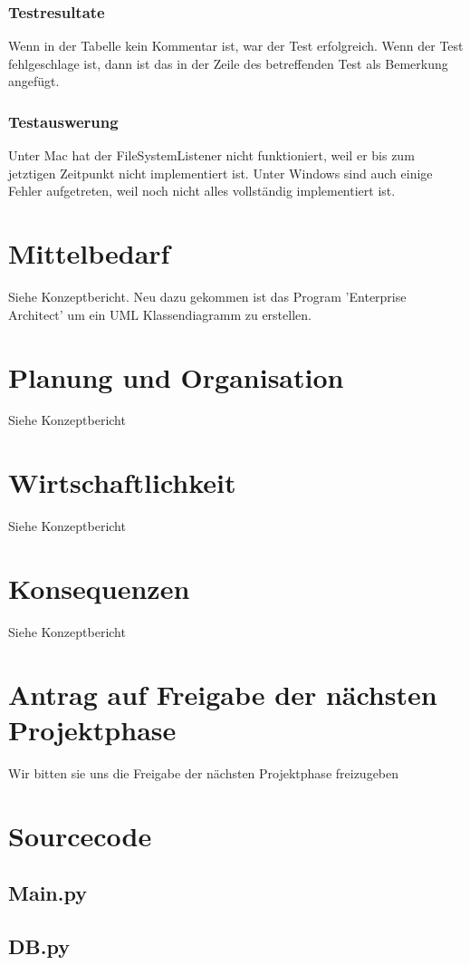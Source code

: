 \documentclass[10pt,paper=a4,final]{scrartcl}
\begin{document}
\subsubsection{Testresultate}
Wenn in der Tabelle kein Kommentar ist, war der Test erfolgreich. Wenn der Test fehlgeschlage ist, dann ist das in der Zeile des betreffenden Test als Bemerkung angefügt.
\subsubsection{Testauswerung}
Unter Mac hat der FileSystemListener nicht funktioniert, weil er bis zum jetztigen Zeitpunkt nicht implementiert ist. Unter Windows sind auch einige Fehler aufgetreten, weil noch nicht alles vollständig implementiert ist.
\section{Mittelbedarf}
Siehe Konzeptbericht.\cite{konzept}  Neu dazu gekommen ist das Program 'Enterprise Architect' um ein UML Klassendiagramm zu erstellen.
\section{Planung und Organisation}
Siehe Konzeptbericht\cite{konzept}
\section{Wirtschaftlichkeit}
Siehe Konzeptbericht\cite{konzept}
\section{Konsequenzen}
Siehe Konzeptbericht\cite{konzept}
\section{Antrag auf Freigabe der n\"achsten Projektphase}
Wir bitten sie uns die Freigabe der n\"achsten Projektphase freizugeben
\section{Sourcecode}
\subsection{Main.py}

\subsection{DB.py}

\end{document}
